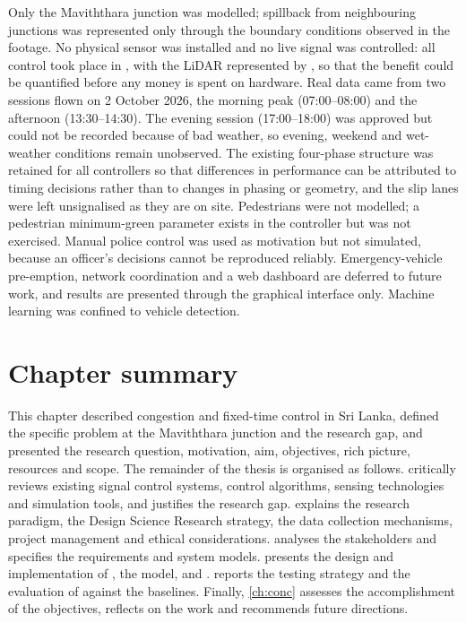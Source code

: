 Only the Maviththara junction was modelled; spillback from neighbouring junctions was represented only through the boundary conditions observed in the footage. No physical sensor was installed and no live signal was controlled: all control took place in \sumo{}, with the LiDAR represented by \vls{}, so that the benefit could be quantified before any money is spent on hardware. Real data came from two sessions flown on 2 October 2026, the morning peak (07:00--08:00) and the afternoon (13:30--14:30). The evening session (17:00--18:00) was approved but could not be recorded because of bad weather, so evening, weekend and wet-weather conditions remain unobserved. The existing four-phase structure was retained for all controllers so that differences in performance can be attributed to timing decisions rather than to changes in phasing or geometry, and the slip lanes were left unsignalised as they are on site. Pedestrians were not modelled; a pedestrian minimum-green parameter exists in the controller but was not exercised. Manual police control was used as motivation but not simulated, because an officer's decisions cannot be reproduced reliably. Emergency-vehicle pre-emption, network coordination and a web dashboard are deferred to future work, and results are presented through the \sumo{} graphical interface only. Machine learning was confined to vehicle detection.

\section{Chapter summary}\label{sec:intro-summary}

This chapter described congestion and fixed-time control in Sri Lanka, defined the specific problem at the Maviththara junction and the research gap, and presented the research question, motivation, aim, objectives, rich picture, resources and scope. The remainder of the thesis is organised as follows.  critically reviews existing signal control systems, control algorithms, sensing technologies and simulation tools, and justifies the research gap.  explains the research paradigm, the Design Science Research strategy, the data collection mechanisms, project management and ethical considerations.  analyses the stakeholders and specifies the requirements and system models.  presents the design and implementation of \dtx{}, the \sumo{} model, \vls{} and \prism{}.  reports the testing strategy and the evaluation of \prism{} against the baselines. Finally, \cref{ch:conc} assesses the accomplishment of the objectives, reflects on the work and recommends future directions.
